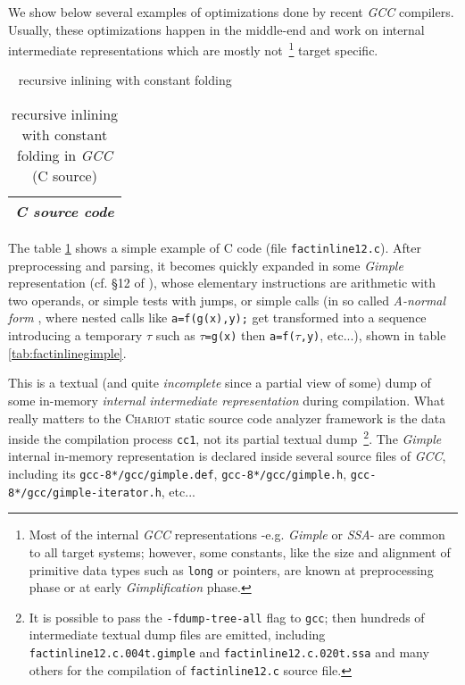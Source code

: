 We show below several examples of optimizations done by recent
\emph{GCC} compilers. Usually, these optimizations happen in the
middle-end and work on internal intermediate representations which are
mostly not~\footnote{Most of the internal \emph{GCC} representations
  -e.g. \emph{Gimple} or \emph{SSA}- are common to all target systems;
  however, some constants, like the size and alignment of primitive
  data types such as \texttt{long} or pointers, are known at
  preprocessing phase or at early \emph{Gimplification} phase.} target
specific.

\bigskip

\bigskip

{{\raisebox{3pt}{\textcolor{brown}{\rule{0.2\textwidth}{2.0pt}}}} ~ \large{recursive inlining with constant folding}}



\begin{table}[!htbp]
\caption{\label{tab:factinlinecsrc} recursive inlining with constant folding in \emph{GCC} (C source)}
   \medskip
  \begin{center}
    \begin{relsize}{-1.2}
     \begin{tabular}{c}
       \\ 
       \textbf{\emph{C source code}} \\ 
       \hline
     \end{tabular}
    \end{relsize}
  \end{center}
\end{table}

The table \ref{tab:factinlinecsrc} shows a simple example of C code
(file \texttt{factinline12.c}). After preprocessing and parsing, it
becomes quickly expanded in some \emph{Gimple}
representation (cf. \S{12} of \cite{gcc-internals}), whose elementary
instructions are arithmetic with two operands, or simple tests with
jumps, or simple calls (in so called \emph{A-normal form}
, where nested calls like \verb+a=f(g(x),y);+ get
transformed into a sequence introducing a temporary $\tau$ such as
$\tau$\verb+=g(x)+ then \verb+a=f(+$\tau$\verb+,y)+, etc...), shown in
table \ref{tab:factinlinegimple}.



This is a textual (and quite
\emph{incomplete} since a partial view of some) dump of some in-memory
\emph{internal intermediate representation} during compilation. What
really matters to the \textsc{Chariot} static source code analyzer
framework is the data inside the compilation process \texttt{cc1}, not
its partial textual dump~\footnote{It is possible to pass the
  \texttt{-fdump-tree-all} flag to \texttt{gcc}; then hundreds of
  intermediate textual dump files are emitted, including
  \texttt{factinline12.c.004t.gimple} and
  \texttt{factinline12.c.020t.ssa} and many others for the compilation
  of \texttt{factinline12.c} source file.}. The \emph{Gimple} internal
in-memory representation is declared inside several source files of
\emph{GCC}, including its \texttt{gcc-8*/gcc/gimple.def},
\texttt{gcc-8*/gcc/gimple.h},
\texttt{gcc-8*/gcc/gimple-iterator.h}, etc...


